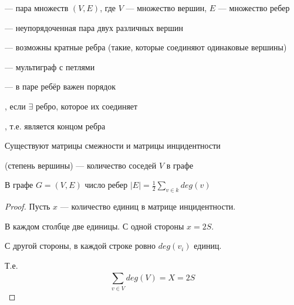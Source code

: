 
\begin{definition}
	 --- пара множеств $(V, E)$, где  $V$ --- множество вершин, $E$ --- множество ребер
\end{definition}

\begin{definition}
	  --- неупорядоченная пара двух различных вершин
\end{definition}

\begin{definition}
	 --- возможны кратные ребра (такие, которые соединяют одинаковые вершины)
\end{definition}

\begin{definition}
	 --- мультиграф с петлями
\end{definition}

\begin{definition}
	 --- в паре ребёр важен порядок
\end{definition}

\begin{definition}
	, если $\exists $ ребро, которое их соединяет 
\end{definition}

\begin{definition}
	, т.е. является концом ребра
\end{definition}

\begin{remark}
	Существуют матрицы смежности и матрицы инцидентности
\end{remark}

\begin{definition}
	(степень вершины) --- количество соседей $V$ в графе
\end{definition}

\begin{theorem}[О рукопожатиях]
	В графе $G = (V,E)$ число ребер $ \left| E \right| = \frac{1}{2} \sum_{v \in k} deg(v) $
\end{theorem}
\begin{proof}
	Пусть $x$ --- количество единиц в матрице инцидентности.

	В каждом столбце две единицы. С одной стороны $x = 2S$.

	С другой стороны, в каждой строке ровно $deg(v_{i})$ единиц.

	Т.е. \[
		\sum_{v\in V}^{} deg(V) = X = 2S 	
	\] 
\end{proof}

